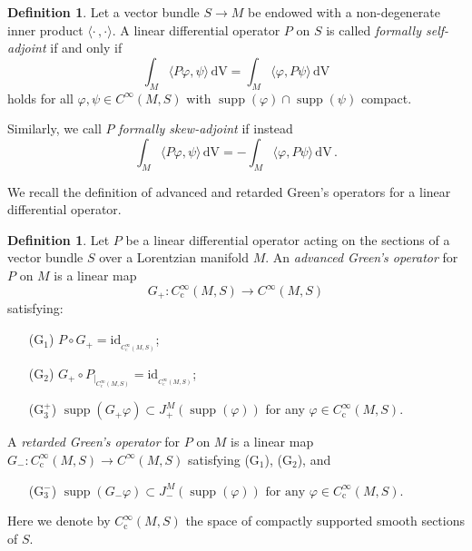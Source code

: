 \documentclass[a4paper,11pt]{amsart}
\theoremstyle{definition}
\newtheorem{definition}[thm]{Definition}
\begin{document}
\begin{definition}\label{def-selfadjoint}
Let a vector bundle $S\to M$ be endowed with a non-degenerate inner product ${\langle}\cdot\,,\cdot{\rangle}$.
A linear differential operator $P$ on $S$ is called \emph{formally self-adjoint} if and only if
\[ \int_M{\langle} P{\varphi},\psi{\rangle} {\,\mathrm{dV}} =\int_M{\langle}{\varphi},P\psi{\rangle} {\,\mathrm{dV}}\]
holds for all ${\varphi},\psi\in {C^\infty}(M,S)$ with ${\operatorname{supp}}({\varphi}) \cap {\operatorname{supp}}(\psi)$ compact.

Similarly, we call $P$ \emph{formally skew-adjoint} if instead
\[ \int_M{\langle} P{\varphi},\psi{\rangle} {\,\mathrm{dV}} =-\int_M{\langle}{\varphi},P\psi{\rangle} {\,\mathrm{dV}}\, .\]
\end{definition}

We recall the definition of advanced and retarded Green's operators for a linear differential operator.

\begin{definition}\label{def-Green}
Let $P$ be a linear differential operator acting on the sections of a vector bundle $S$ over a Lorentzian manifold $M$.
An \emph{advanced Green's operator} for $P$ on $M$ is a linear map 
\[G_+:{C^\infty_\mathrm{c}}(M,S)\to {C^\infty}(M,S)\]
satisfying:
\begin{itemize}
\item[(G$_1$)] $P\circ G_+={\mathrm{id}}_{_{{C^\infty_\mathrm{c}}(M,S)}}$;
\item[(G$_2$)] $G_+\circ P_{|_{{C^\infty_\mathrm{c}}(M,S)}}={\mathrm{id}}_{_{{C^\infty_\mathrm{c}}(M,S)}}$;
\item[(G$_3^+$)] ${\operatorname{supp}}(G_+{\varphi})\subset J_+^M({\operatorname{supp}}({\varphi}))$ for any ${\varphi}\in{C^\infty_\mathrm{c}}(M,S)$.
\end{itemize}
A \emph{retarded Green's operator} for $P$ on $M$ is a linear map $G_-:{C^\infty_\mathrm{c}}(M,S)\to {C^\infty}(M,S)$ satisfying (G$_1$), (G$_2$), and 
\begin{itemize}
\item[(G$_3^-$)]
${\operatorname{supp}}(G_-{\varphi})\subset J_-^M({\operatorname{supp}}({\varphi}))\textrm{ for any }{\varphi}\in{C^\infty_\mathrm{c}}(M,S).$
\end{itemize}
\end{definition}

Here we denote by ${C^\infty_\mathrm{c}}(M,S)$ the space of compactly supported smooth sections of $S$.
\end{document}
